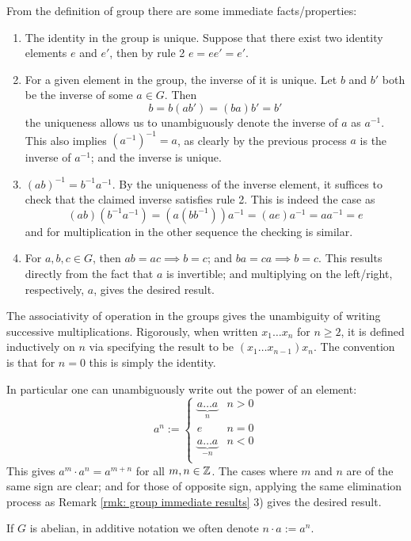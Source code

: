 \documentclass{article}
\begin{document}
\begin{remark}\label{rmk: group immediate results}
    From the definition of group there are some immediate facts/properties:
    \begin{enumerate}[label=\arabic*)]
        \item The identity in the group is unique. Suppose that there exist two identity elements $e$ and $e'$, then by rule 2 $e = ee' = e'$.
        \item For a given element in the group, the inverse of it is unique. Let $b$ and $b'$ both be the inverse of some $a \in G$. Then
        \[
            b = b(ab') = (ba)b' = b'    
        \]
        the uniqueness allows us to unambiguously denote the inverse of $a$ as $a^{-1}$. This also implies $(a^{-1})^{-1} = a$, as clearly by the previous process $a$ is the inverse of $a^{-1}$; and the inverse is unique.
        \item $(ab)^{-1} = b^{-1} a^{-1}$. By the uniqueness of the inverse element, it suffices to check that the claimed inverse satisfies rule 2. This is indeed the case as
        \[
            (ab)(b^{-1}a^{-1}) = (a(bb^{-1}))a^{-1} = (ae)a^{-1} = aa^{-1} = e
        \]
        and for multiplication in the other sequence the checking is similar. 
        \item For $a, b, c \in G$, then $ab = ac \implies b = c$; and $ba = ca \implies b = c$. This results directly from the fact that $a$ is invertible; and multiplying on the left/right, respectively, $a$, gives the desired result.
    \end{enumerate}
\end{remark}

\begin{remark}\label{rmk: Z to group element}
    The associativity of operation in the groups gives the unambiguity of writing successive multiplications. Rigorously, when written $x_1\ldots x_n$ for $n \geq 2$, it is defined inductively on $n$ via specifying the result to be $(x_1\ldots x_{n-1})x_n$. The convention is that for $n = 0$ this is simply the identity.

    In particular one can unambiguously write out the power of an element:
    \[
        a^n := \begin{cases}
            \underbrace{a\ldots a}_{n}  & n > 0 \\
            e                           & n = 0 \\
            \underbrace{a\ldots a}_{-n} & n < 0 \\
        \end{cases}
    \]
    This gives $a^m \cdot a^n = a^{m + n}$ for all $m, n \in \mathbb{Z}$. The cases where $m$ and $n$ are of the same sign are clear; and for those of opposite sign, applying the same elimination process as Remark \ref{rmk: group immediate results} 3) gives the desired result.

    If $G$ is abelian, in additive notation we often denote $n \cdot a := a^n$.
\end{remark}
\end{document}
